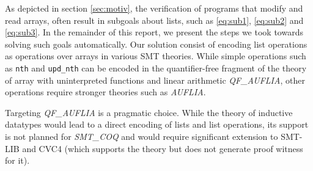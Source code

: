 \documentclass[onecolumn, preprint]{sigplanconf}
\begin{document}
As depicted in section \ref{sec:motiv}, the verification of programs that modify and read arrays, often result in subgoals about lists, such as \ref{eq:sub1}, \ref{eq:sub2} and \ref{eq:sub3}. In the remainder of this report, we present the steps we took towards solving such goals automatically. Our solution consist of encoding list operations as operations over arrays in various SMT theories. While simple operations such as \texttt{nth} and \texttt{upd\_nth} can be encoded in the quantifier-free fragment of the theory of array with uninterpreted functions and linear arithmetic \emph{QF\_AUFLIA}, other operations require stronger theories such as \emph{AUFLIA}. 

Targeting \emph{QF\_AUFLIA} is a pragmatic choice. While the theory of inductive datatypes would lead to a direct encoding of lists and list operations, its support is not planned for \emph{SMT\_COQ} and would require significant extension to SMT-LIB and CVC4 (which supports the theory but does not generate proof witness for it). 




\end{document}
